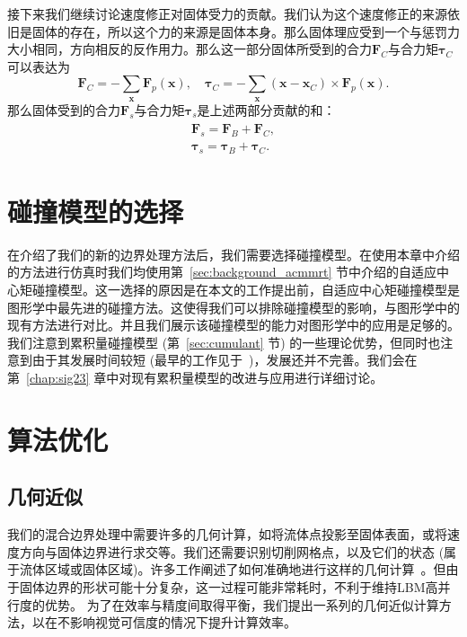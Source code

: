接下来我们继续讨论速度修正对固体受力的贡献。我们认为这个速度修正的来源依旧是固体的存在，所以这个力的来源是固体本身。那么固体理应受到一个与惩罚力大小相同，方向相反的反作用力。那么这一部分固体所受到的合力$\bm{F}_{C}$与合力矩$\bm{\tau}_{C}$可以表达为
\begin{equation}
\bm{F}_{C} = - \sum_{\bm{x}}\bm{F}_p(\bm{x}), \quad \bm{\tau}_{C} = - \sum_{\bm{x}} (\bm{x}-\bm{x}_{C})\times\bm{F}_p(\bm{x}).
\end{equation}
那么固体受到的合力$\bm{F}_s$与合力矩$\bm{\tau}_s$是上述两部分贡献的和：
\begin{align}
  \begin{split}
    \bm{F}_s = \bm{F}_{B} + \bm{F}_{C} ,\\
    \bm{\tau}_s = \bm{\tau}_{B} + \bm{\tau}_{C} .
  \end{split}
\end{align}

\section{碰撞模型的选择}
\label{sec:collision_selection}
在介绍了我们的新的边界处理方法后，我们需要选择碰撞模型。在使用本章中介绍的方法进行仿真时我们均使用第~\ref{sec:background_acmmrt} 节中介绍的自适应中心矩碰撞模型。这一选择的原因是在本文的工作提出前，自适应中心矩碰撞模型是图形学中最先进的碰撞方法。这使得我们可以排除碰撞模型的影响，与图形学中的现有方法进行对比。并且我们展示该碰撞模型的能力对图形学中的应用是足够的。我们注意到累积量碰撞模型 (第~\ref{sec:cumulant} 节) 的一些理论优势，但同时也注意到由于其发展时间较短 (最早的工作见于~\citep{Geier-2015})，发展还并不完善。我们会在第~\ref{chap:sig23} 章中对现有累积量模型的改进与应用进行详细讨论。

\section{算法优化}
\subsection{几何近似}
我们的混合边界处理中需要许多的几何计算，如将流体点投影至固体表面，或将速度方向与固体边界进行求交等。我们还需要识别切削网格点，以及它们的状态 (属于流体区域或固体区域)。许多工作阐述了如何准确地进行这样的几何计算~\citep{Azevedo-2016,Robinson:2009}。但由于固体边界的形状可能十分复杂，这一过程可能非常耗时，不利于维持LBM高并行度的优势。
为了在效率与精度间取得平衡，我们提出一系列的几何近似计算方法，以在不影响视觉可信度的情况下提升计算效率。

